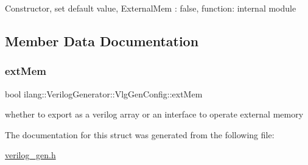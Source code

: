 Constructor, set default value, External\+Mem \+: false, function\+: internal module 

\subsection{Member Data Documentation}
\mbox{\label{structilang_1_1_verilog_generator_1_1_vlg_gen_config_ac18ab88b5ead347495aaf8724cdd245d}} 
\subsubsection{\texorpdfstring{ext\+Mem}{extMem}}
{\footnotesize\ttfamily bool ilang\+::\+Verilog\+Generator\+::\+Vlg\+Gen\+Config\+::ext\+Mem}

whether to export as a verilog array or an interface to operate external memory 

The documentation for this struct was generated from the following file\+:\begin{DoxyCompactItemize}
\item 
\mbox{\hyperlink{verilog__gen_8h}{verilog\+\_\+gen.\+h}}\end{DoxyCompactItemize}
